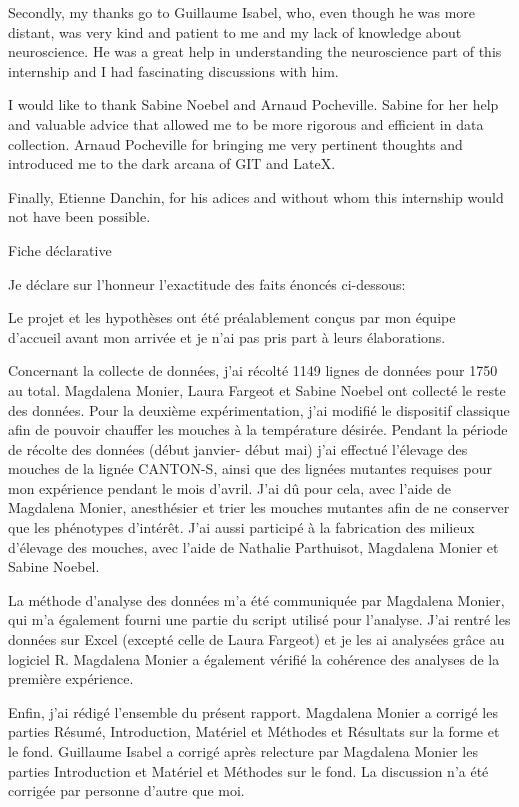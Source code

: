 \documentclass[a4paper, 12pt]{article}
\begin{document}
	Secondly, my thanks go to Guillaume Isabel, who, even though he was more distant, was very kind and patient to me and my lack of knowledge about neuroscience. He was a great help in understanding the neuroscience part of this internship and I had fascinating discussions with him.
	
	I would like to thank Sabine Noebel and Arnaud Pocheville. Sabine for her help and valuable advice that allowed me to be more rigorous and efficient in data collection. Arnaud Pocheville for bringing me very pertinent thoughts and introduced me to the dark arcana of GIT and LateX.
	
	Finally, Etienne Danchin, for his adices and without whom this internship would not have been possible.
	\clearpage
 \begin{LARGE}
Fiche déclarative
 \end{LARGE}


	Je déclare sur l'honneur l’exactitude des faits énoncés ci-dessous:
	
	Le projet et les hypothèses ont été préalablement conçus par mon équipe d’accueil avant mon arrivée et je n’ai pas pris part à leurs élaborations.
	
	Concernant la collecte de données, j’ai récolté 1149 lignes de données pour 1750 au total. Magdalena Monier, Laura Fargeot et Sabine Noebel ont collecté le reste des données. Pour la deuxième expérimentation, j’ai modifié le dispositif classique afin de pouvoir chauffer les mouches à la température désirée. 
	Pendant la période de récolte des données (début janvier- début mai) j’ai effectué l’élevage des mouches de la lignée CANTON-S, ainsi que des lignées mutantes requises pour mon expérience pendant le mois d’avril. J’ai dû pour cela, avec l’aide de Magdalena Monier, anesthésier et trier les mouches mutantes afin de ne conserver que les phénotypes d’intérêt. J’ai aussi participé à la fabrication des milieux d’élevage des mouches, avec l’aide de Nathalie Parthuisot, Magdalena Monier et Sabine Noebel.  
	
	La méthode d’analyse des données m’a été communiquée par Magdalena Monier, qui m’a également fourni une partie du script utilisé pour l’analyse. J’ai rentré les données sur Excel (excepté celle de Laura Fargeot) et je les ai analysées grâce au logiciel R. Magdalena Monier a également vérifié la cohérence des analyses de la première expérience.
	
	Enfin, j’ai rédigé l’ensemble du présent rapport. Magdalena Monier a corrigé les parties Résumé, Introduction, Matériel et Méthodes et Résultats sur la forme et le fond. Guillaume Isabel a corrigé après relecture par Magdalena Monier les parties Introduction et Matériel et Méthodes sur le fond. La discussion n’a été corrigée par personne d’autre que moi. 
\end{document}
